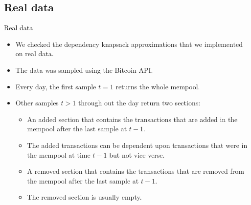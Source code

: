 \documentclass{beamer}
\begin{document}
\subsection* {Real data}
\begin{frame}{Real data}{} 
    \begin{itemize}
        \item {We checked the dependency knapsack approximations that we 
        implemented on real data.}
        \item {The data was sampled using the Bitcoin API.}
        \item {Every day, the first sample $t=1$ returns the whole mempool.}
        \item {Other samples $t>1$ through out the day return two sections:}
        \begin{itemize}
            \item {An added section that contains the transactions that are 
            added in the mempool after the last sample at $t-1$.}
            \item {The added transactions can be dependent upon transactions 
            that were in the mempool at time $t-1$ but not vice verse.}
            \item {A removed section that contains the transactions that are 
            removed from the mempool after the last sample at $t-1$.}
            \item {The removed section is usually empty.}
        \end{itemize}
    \end{itemize}
\end{frame}
\end{document}
